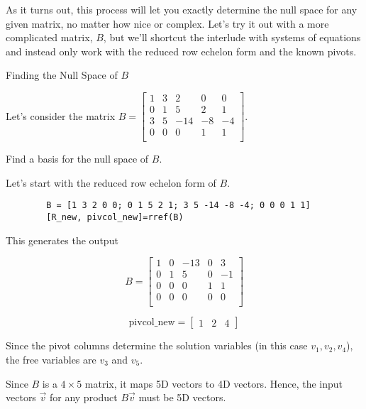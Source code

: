 \documentclass{ximera}
\begin{document}
As it turns out, this process will let you exactly determine the null space for any given matrix, no matter how nice or complex. Let's try it out with a more complicated matrix, $B$, but we'll shortcut the interlude with systems of equations and instead only work with the reduced row echelon form and the known pivots.

\begin{problem}{Finding the Null Space of $B$}

    Let's consider the matrix $B=\begin{bmatrix}
        1 & 3 & 2 & 0 & 0  \\
        0 & 1 & 5 & 2 & 1  \\
        3 & 5 & -14 & -8 &-4  \\
        0 & 0 & 0 & 1 & 1  \\
        \end{bmatrix}$.

    Find a basis for the null space of $B$.

    \begin{solution}

        Let's start with the reduced row echelon form of $B$.

       \begin{verbatim}
        B = [1 3 2 0 0; 0 1 5 2 1; 3 5 -14 -8 -4; 0 0 0 1 1]
        [R_new, pivcol_new]=rref(B)
    \end{verbatim}

        This generates the output
        
        \[
            B=\begin{bmatrix}
                1 & 0 & -13 & 0 & 3 \\
                0 & 1 & 5 & 0 & -1 \\
                0 & 0 & 0 & 1 & 1 \\
                0 & 0 & 0 & 0 & 0 \\
            \end{bmatrix}
        \]


    $$\text{pivcol\_new}=\begin{bmatrix} 1 & 2 & 4 \end{bmatrix}$$

    Since the pivot columns determine the solution variables (in this case $v_1, v_2, v_4$), the free variables are $v_3$ and $v_5$. 

    Since $B$ is a $4\times 5$ matrix, it maps 5D vectors to 4D vectors. Hence, the input vectors $\vec{v}$ for any product $B\vec{v}$ must be 5D vectors.


\end{solution}
\end{problem}
\end{document}
